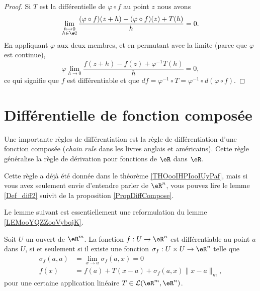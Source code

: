 \begin{proof}
	Si \( T\) est la différentielle de \( \varphi\circ f\) au point \( z\) nous avons
	\begin{equation}
		\lim_{\substack{h\to 0\\h\in \eC}}\frac{ (\varphi\circ f)(z+h)-(\varphi\circ f)(z)+T(h) }{ h }=0.
	\end{equation}
	En appliquant \( \varphi\) aux deux membres, et en permutant avec la limite (parce que \( \varphi\) est continue),
	\begin{equation}
		\varphi\lim_{h\to 0} \frac{ f(z+h)-f(z)+\varphi^{-1} T(h) }{ h }=0,
	\end{equation}
	ce qui signifie que \( f\) est différentiable et que \( df=\varphi^{-1}\circ T=\varphi^{-1}\circ d(\varphi\circ f)\).
\end{proof}

\section{Différentielle de fonction composée}

Une importante règles de différentiation est la règle de différentiation d'une fonction composée (\emph{chain rule} dans les livres anglais et américains). Cette règle généralise la règle de dérivation pour fonctions de \( \eR\) dans \( \eR\).

Cette règle a déjà été donnée dans le théorème \ref{THOooIHPIooIUyPaf}, mais si vous avez seulement envie d'entendre parler de \( \eR^n\), vous pouvez lire le lemme \ref{Def_diff2} suivit de la proposition \ref{PropDiffCompose}.

Le lemme suivant est essentiellement une reformulation du lemme \ref{LEMooYQZZooVybqjK}.
\begin{lemma}\label{Def_diff2}
	Soit \( U\) un ouvert de \( \eR^m\). La fonction \( f: U\to\eR^n\) est différentiable au point \( a\) dans \( U\), si et seulement si il existe une fonction \( \sigma_f: U\times U\to \eR^n\) telle que
	\begin{subequations}		\label{SubEqsDiff2}
		\begin{align}
			\sigma_f(a,a) & =\lim_{x\to a} \sigma_f(a,x)=0                           \\
			f(x)          & =f(a)+T(x-a)+\sigma_f(a,x)\|x-a\|_m,   \label{def_diff2}
		\end{align}
	\end{subequations}
	pour une certaine application linéaire \( T\in\mathcal{L}(\eR^m,\eR^n)\).
\end{lemma}

